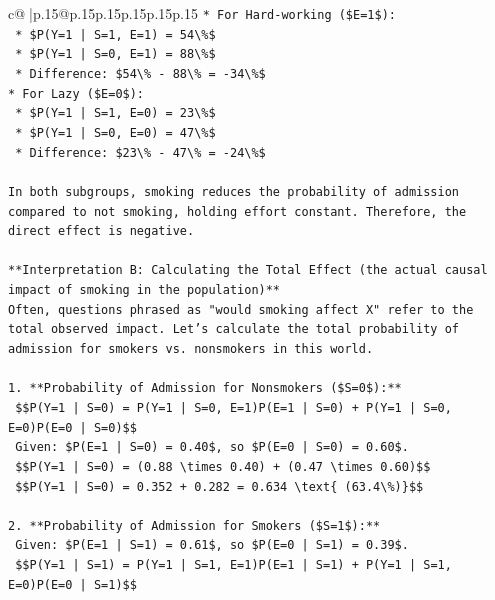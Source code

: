 \documentclass{article}
\begin{document}
{\begin{supertabular}{c@{$\;$}|p{.15\linewidth}@{}p{.15\linewidth}p{.15\linewidth}p{.15\linewidth}p{.15\linewidth}p{.15\linewidth}}
{{{\texttt{*   For Hard{-}working (\$E=1\$):} \\
\texttt{    *   \$P(Y=1 | S=1, E=1) = 54\textbackslash{}\%\$} \\
\texttt{    *   \$P(Y=1 | S=0, E=1) = 88\textbackslash{}\%\$} \\
\texttt{    *   Difference: \$54\textbackslash{}\% {-} 88\textbackslash{}\% = {-}34\textbackslash{}\%\$} \\
\texttt{*   For Lazy (\$E=0\$):} \\
\texttt{    *   \$P(Y=1 | S=1, E=0) = 23\textbackslash{}\%\$} \\
\texttt{    *   \$P(Y=1 | S=0, E=0) = 47\textbackslash{}\%\$} \\
\texttt{    *   Difference: \$23\textbackslash{}\% {-} 47\textbackslash{}\% = {-}24\textbackslash{}\%\$} \\
\\ 
\texttt{In both subgroups, smoking reduces the probability of admission compared to not smoking, holding effort constant. Therefore, the direct effect is negative.} \\
\\ 
\texttt{**Interpretation B: Calculating the Total Effect (the actual causal impact of smoking in the population)**} \\
\texttt{Often, questions phrased as "would smoking affect X" refer to the total observed impact. Let's calculate the total probability of admission for smokers vs. nonsmokers in this world.} \\
\\ 
\texttt{1.  **Probability of Admission for Nonsmokers (\$S=0\$):**} \\
\texttt{    \$\$P(Y=1 | S=0) = P(Y=1 | S=0, E=1)P(E=1 | S=0) + P(Y=1 | S=0, E=0)P(E=0 | S=0)\$\$} \\
\texttt{    Given: \$P(E=1 | S=0) = 0.40\$, so \$P(E=0 | S=0) = 0.60\$.} \\
\texttt{    \$\$P(Y=1 | S=0) = (0.88 \textbackslash{}times 0.40) + (0.47 \textbackslash{}times 0.60)\$\$} \\
\texttt{    \$\$P(Y=1 | S=0) = 0.352 + 0.282 = 0.634 \textbackslash{}text\{ (63.4\textbackslash{}\%)\}\$\$} \\
\\ 
\texttt{2.  **Probability of Admission for Smokers (\$S=1\$):**} \\
\texttt{    Given: \$P(E=1 | S=1) = 0.61\$, so \$P(E=0 | S=1) = 0.39\$.} \\
\texttt{    \$\$P(Y=1 | S=1) = P(Y=1 | S=1, E=1)P(E=1 | S=1) + P(Y=1 | S=1, E=0)P(E=0 | S=1)\$\$} \\
}}}
\end{supertabular}}
\end{document}
